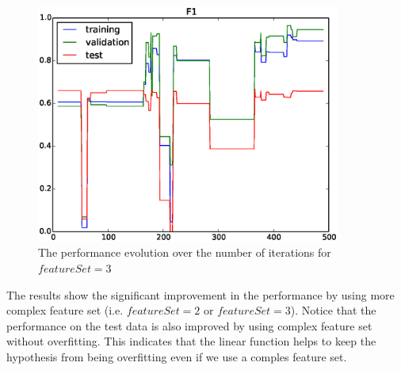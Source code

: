 \begin{figure}[hbtp]
\centering
\includegraphics[width=100mm]{learning_curve_3}
\caption{The performance evolution over the number of iterations for $featureSet=3$}
\label{fig:learning_curve_3}
\end{figure}

The results show the significant improvement in the performance by using more complex feature set (i.e. $featureSet = 2$ or $featureSet = 3$). Notice that the performance on the test data is also improved by using complex feature set without overfitting. This indicates that the linear function helps to keep the hypothesis from being overfitting even if we use a comples feature set.



